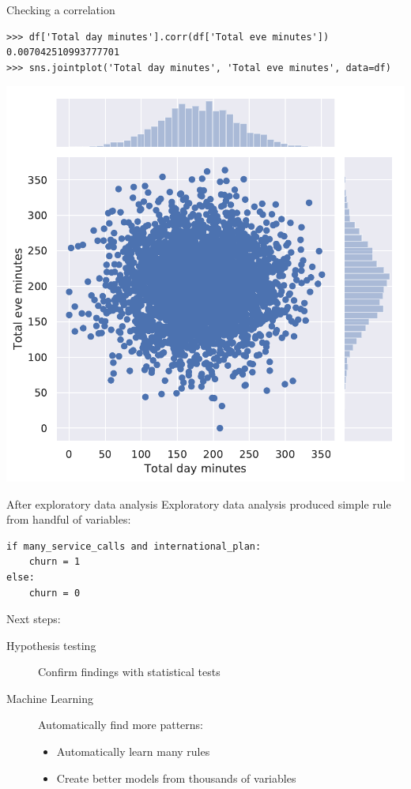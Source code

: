 \documentclass[aspectratio=169,usenames,dvipsnames]{beamer}
\begin{document}
\begin{frame}[fragile]{Checking a correlation}
\begin{lstlisting}
>>> df['Total day minutes'].corr(df['Total eve minutes'])
0.007042510993777701
>>> sns.jointplot('Total day minutes', 'Total eve minutes', data=df)
\end{lstlisting}

\includegraphics[height=0.6\textheight]{fig/scatter}
\end{frame}

\begin{frame}[fragile]{After exploratory data analysis}
Exploratory data analysis produced
simple rule from handful of variables:

\begin{lstlisting}
if many_service_calls and international_plan:
    churn = 1
else:
    churn = 0
\end{lstlisting}

Next steps:
\begin{description}
    \item[Hypothesis testing] Confirm findings with statistical tests
    \item[Machine Learning] Automatically find more patterns:
        \begin{itemize}
            \item Automatically learn many rules
            \item Create better models from thousands of variables
        \end{itemize}
\end{description}
\end{frame}
\end{document}
